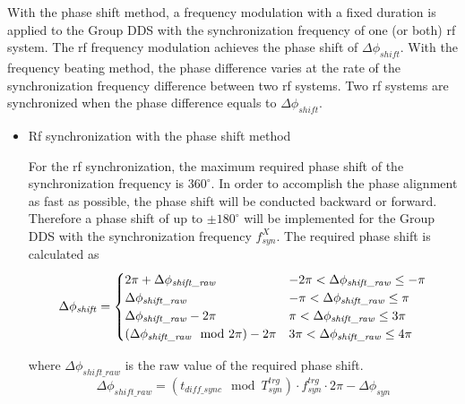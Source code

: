 With the phase shift method, a frequency modulation with a fixed duration is applied to the Group DDS with the synchronization frequency of one (or both) rf system. The rf frequency modulation achieves the phase shift of $\Delta \phi_\mathit{shift}$. With the frequency beating method, the phase difference varies at the rate of the synchronization frequency difference between two rf systems. Two rf systems are synchronized when the phase difference equals to $\Delta \phi_\mathit{shift}$. 

\begin{itemize}
\item Rf synchronization with the phase shift method

 
For the rf synchronization, the maximum required phase shift of the synchronization frequency is $360^\circ$. In order to accomplish the phase alignment as fast as possible, the phase shift will be conducted backward or forward. Therefore a phase shift of up to $\pm 180^\circ$ will be implemented for the Group DDS with the synchronization frequency $f_\mathit{syn}^X$. The required phase shift is calculated as
\begin{eqnarray}\Delta \phi_\mathit{shift}=
\begin{cases} 
2\pi+ \Delta \phi_\mathit{shift\_raw} & -2\pi<\Delta \phi_\mathit{shift\_raw}\le-\pi \cr

\Delta \phi_\mathit{shift\_raw} & -\pi<\Delta \phi_\mathit{shift\_raw}\le\pi \cr

\Delta \phi_\mathit{shift\_raw} -2\pi &  \pi<\Delta \phi_\mathit{shift\_raw}\le3\pi \cr

(\Delta \phi_\mathit{shift\_raw} \mod 2\pi) -2\pi &  3\pi<\Delta \phi_\mathit{shift\_raw}\le4\pi 

\label{phase_shift_eq}
\end{cases}
\end{eqnarray}

where $\Delta \phi_\mathit{shift\_raw}$ is the raw value of the required phase shift.
 \begin{equation}
\Delta \phi_\mathit{shift\_raw}= (t_{\mathit{diff\_sync}} \mod T_\mathit{syn}^\mathit{trg}) \cdot f_\mathit{syn}^\mathit{trg}\cdot 2\pi -\Delta \phi_\mathit{syn}
\end{equation}


\end{itemize}
